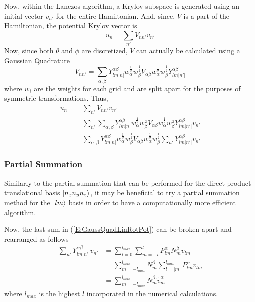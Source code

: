 \documentclass{revtex4-1}
\begin{document}
Now, within the Lanczos algorithm, a Krylov subspace is generated using an initial vector $v_{n'}$ for the entire Hamiltonian. And, since, $V$ is a part of the Hamiltonian, the potential Krylov vector is 
\begin{equation}
u_{n} = \sum_{n'}V_{nn'}v_{n'}
\end{equation}
Now, since both $\theta$ and $\phi$ are discretized, $V$ can actually be calculated using a Gaussian Quadrature
\begin{equation}
V_{nn'} = \sum_{\alpha,\beta}Y_{lm\lbrack n\rbrack}^{\alpha\beta}w_{\alpha}^{\frac{1}{2}}w_{\beta}^{\frac{1}{2}}V_{\alpha\beta}w_{\alpha}^{\frac{1}{2}}w_{\beta}^{\frac{1}{2}}Y_{lm\lbrack n'\rbrack}^{\alpha\beta}
\end{equation}
where $w_{i}$ are the weights for each grid and are split apart for the purposes of symmetric transformations. Thus,
\begin{align}
u_{n} 	&= \sum_{n'}V_{nn'}v_{n'} \\
		&= \sum_{n'}\sum_{\alpha,\beta}Y_{lm\lbrack n\rbrack}^{\alpha\beta}w_{\alpha}^{\frac{1}{2}}w_{\beta}^{\frac{1}{2}}V_{\alpha\beta}w_{\alpha}^{\frac{1}{2}}w_{\beta}^{\frac{1}{2}}Y_{lm\lbrack n'\rbrack}^{\alpha\beta}v_{n'}\\
		&= \sum_{\alpha,\beta}Y_{lm\lbrack n\rbrack}^{\alpha\beta}w_{\alpha}^{\frac{1}{2}}w_{\beta}^{\frac{1}{2}}V_{\alpha\beta}w_{\alpha}^{\frac{1}{2}}w_{\beta}^{\frac{1}{2}}\sum_{n'}Y_{lm\lbrack n'\rbrack}^{\alpha\beta}v_{n'} \label{E:GaussQuadLinRotPot}
\end{align}

\subsubsection{Partial Summation}
Similarly to the partial summation that can be performed for the direct product translational basis $\ket{n_{x}n_{y}n_{z}}$, it may be beneficial to try a partial summation method for the $\ket{lm}$ basis in order to have a computationally more efficient algorithm.

Now, the last sum in (\ref{E:GaussQuadLinRotPot}) can be broken apart and rearranged as follows
\begin{align}
\sum_{n'}Y_{lm\lbrack n'\rbrack}^{\alpha\beta}v_{n'} 	&= \sum_{l=0}^{l_{max}}\sum_{m=-l}^{l}P_{lm}^{\alpha}N_{m}^{\beta}v_{lm} \label{E:GaussQuadLinRotPotFullSum}\\
													&= \sum_{m=-l_{max}}^{l_{max}}N_{m}^{\beta}\sum_{l=|m|}^{l_{max}}P_{lm}^{\alpha}v_{lm} \label{E:GaussQuadLinRotPotPartSum} \\ 
													&= \sum_{m=-l_{max}}^{l_{max}}N_{m}^{\beta}\tilde{v}_{m}^{\alpha} \label{E:GaussQuadLinRotPotPartSumVec}
\end{align}
where $l_{max}$ is the highest $l$ incorporated in the numerical calculations.
\end{document}
